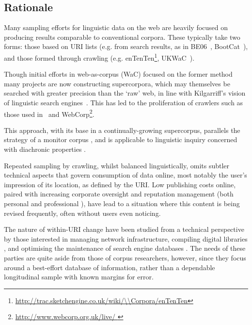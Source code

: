 

\subsection{Rationale}

Many sampling efforts for linguistic data on the web are heavily focused on producing results comparable to conventional corpora.  These typically take two forms: those based on URI lists (e.g. from search results, as in %
BE06~\cite{baker2009be06}, BootCat~\cite{baroni2004bootcat}), and those formed through crawling (e.g. enTenTen\footnote{\url{http://trac.sketchengine.co.uk/wiki/\\Corpora/enTenTen}}, %
UKWaC~\cite{ferraresi2008introducing}).

Though initial efforts in web-as-corpus (WaC) focused on the former method %
many projects are now constructing supercorpora, which may themselves be searched with greater precision than the `raw' web, in line with Kilgarriff's vision of linguistic search engines~\cite{kilgarriff2003linguistic}.  This has led to the proliferation of crawlers such as those used in~\cite{schafer8building} and WebCorp\footnote{\url{http://www.webcorp.org.uk/live/
}}.%


This approach, with its base in a continually-growing supercorpus, parallels the strategy of a monitor corpus%
, and is applicable to linguistic inquiry concerned with diachronic properties%
.


Repeated sampling by crawling, whilst balanced linguistically, omits subtler technical aspects that govern consumption of data online, most notably the user's impression of its location, as defined by the URI.  Low publishing costs online, paired with increasing corporate oversight and reputation management (both personal %
and professional%
), have lead to a situation where this content is being revised frequently, often without users even noticing.

The nature of within-URI change have been studied from a technical perspective by those interested in managing network infrastructure, compiling digital libraries%
, and optimising the maintenance of search engine databases%
.  The needs of these parties are quite aside from those of corpus researchers, however, since they focus around a best-effort database of information, rather than a dependable longitudinal sample with known margins for error.

